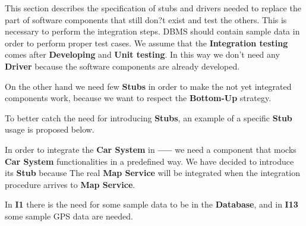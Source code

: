 This section describes the specification of stubs and drivers needed to replace the part of software components that still don?t exist and test the others. This is necessary to perform the integration steps. DBMS should contain sample data in order to perform proper test cases. We assume that the \textbf{Integration testing} comes after \textbf{Developing} and \textbf{Unit testing}. In this way we don't need any \textbf{Driver} because the software components are already developed.\par
On the other hand we need few \textbf{Stubs} in order to make the not yet integrated components work, because we want to respect the \textbf{Bottom-Up} strategy.\par
To better catch the need for introducing \textbf{Stubs}, an example of a specific \textbf{Stub} usage is proposed below.\par
In order to integrate the \textbf{Car System} in \textbf{-----} we need a component that mocks \textbf{Car System} functionalities in a predefined way. We have decided to introduce its \textbf{Stub} because
The real \textbf{Map Service} will be integrated when the integration procedure arrives to \textbf{Map Service}.\par
In \textbf{I1} there is the need for some sample data to be in the \textbf{Database}, and in \textbf{I13} some sample GPS data are needed.
